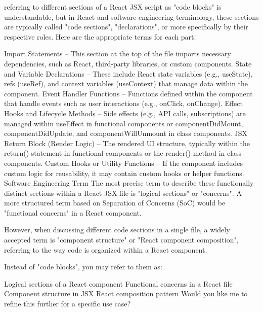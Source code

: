 referring to different sections of a React JSX script as "code blocks" is understandable, but in React and software engineering terminology, these sections are typically called "code sections", "declarations", or more specifically by their respective roles. Here are the appropriate terms for each part:

Import Statements – This section at the top of the file imports necessary dependencies, such as React, third-party libraries, or custom components.
State and Variable Declarations – These include React state variables (e.g., useState), refs (useRef), and context variables (useContext) that manage data within the component.
Event Handler Functions – Functions defined within the component that handle events such as user interactions (e.g., onClick, onChange).
Effect Hooks and Lifecycle Methods – Side effects (e.g., API calls, subscriptions) are managed within useEffect in functional components or componentDidMount, componentDidUpdate, and componentWillUnmount in class components.
JSX Return Block (Render Logic) – The rendered UI structure, typically within the return() statement in functional components or the render() method in class components.
Custom Hooks or Utility Functions – If the component includes custom logic for reusability, it may contain custom hooks or helper functions.
Software Engineering Term
The most precise term to describe these functionally distinct sections within a React JSX file is "logical sections" or "concerns". A more structured term based on Separation of Concerns (SoC) would be "functional concerns" in a React component.

However, when discussing different code sections in a single file, a widely accepted term is "component structure" or "React component composition", referring to the way code is organized within a React component.

Instead of "code blocks", you may refer to them as:

Logical sections of a React component
Functional concerns in a React file
Component structure in JSX
React composition pattern
Would you like me to refine this further for a specific use case?